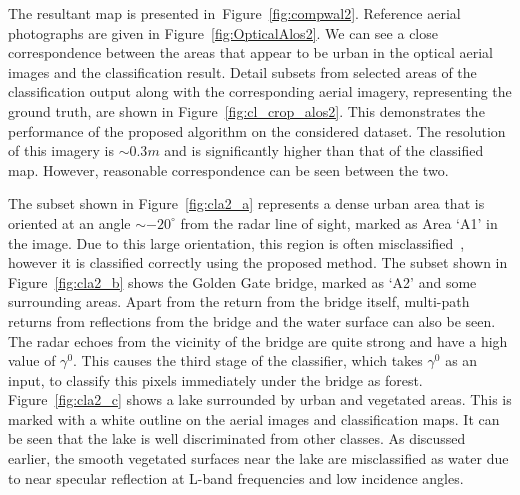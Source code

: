 The resultant  map is presented in~Figure~\ref{fig:compwal2}. Reference aerial photographs are given in Figure~\ref{fig:OpticalAlos2}. We can see a close correspondence between the areas that appear to be urban in the optical aerial images and the  classification result. %
Detail subsets from selected areas of the classification output along with the corresponding aerial imagery, representing the ground truth, are shown in Figure~\ref{fig:cl_crop_alos2}. This demonstrates the performance of the proposed algorithm on the considered dataset. The resolution of this imagery is $\sim0.3m$ and is significantly higher than that of the classified map. However, reasonable correspondence can be seen between the two. 





The subset shown in Figure~\ref{fig:cla2_a} represents a dense urban area that is oriented at an angle $\sim-20^\circ$ from the radar line of sight, marked as Area `A1' in the image. Due to this large orientation, this region is often misclassified~\cite{lee11_5491157}, however it is classified correctly using the proposed method. %
The subset shown in Figure~\ref{fig:cla2_b} shows the Golden Gate bridge, marked as `A2' and some surrounding areas. Apart from the return from the bridge itself,   multi-path returns from reflections from the bridge and the water surface can also be seen. The radar echoes from the vicinity of the bridge are quite strong and have a high value of $\gamma^0$. This causes the third stage of the classifier, which takes $\gamma^0$ as an input, to classify this pixels immediately under the bridge as forest. 
Figure~\ref{fig:cla2_c} shows a lake surrounded by urban and vegetated areas. This is marked with a white outline on the aerial images and classification maps.  It can be seen that the lake  is well discriminated from other classes. As discussed earlier, the smooth vegetated surfaces near the lake are misclassified as water due to near specular reflection at L-band frequencies and low incidence angles. 

